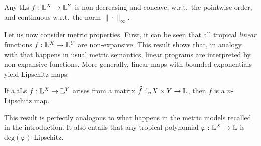\documentclass[submission,%
]{eptcs}
\begin{document}
\begin{proposition}\label{prop:nondecr+conc}
 Any tLs $f:\mathbb{L}^X\to\mathbb{L}^Y$ is non-decreasing and concave, w.r.t.\ the pointwise order, and continuous w.r.t.~the norm $\|\cdot\|_{\infty}$.
\end{proposition}





%

Let us now consider metric properties. First, it can be seen that all tropical \emph{linear} functions $f: \mathbb{L}^{X}\to \mathbb{L}^{Y}$ are non-expansive. 
This result shows that, in analogy with that happens in usual metric semantics, linear programs are interpreted by non-expansive functions. 
More generally, linear maps with bounded exponentials yield Lipschitz maps:
\begin{proposition}\label{prop:boundedlip}
If a tLs $f: \mathbb{L}^{X}\to \mathbb{L}^{Y}$ arises from a %
matrix $\widehat{f}:!_{n}X\times Y\to \mathbb{L}$, then $f$ is a $n$-Lipschitz map.
\end{proposition}
This result is perfectly analogous to what happens in the metric models recalled in the introduction. %
It also entails that any tropical polynomial $\varphi:\mathbb{L}^{X}\to\mathbb{L}$ is $\mathrm{deg}(\varphi)$-Lipschitz.
\end{document}
